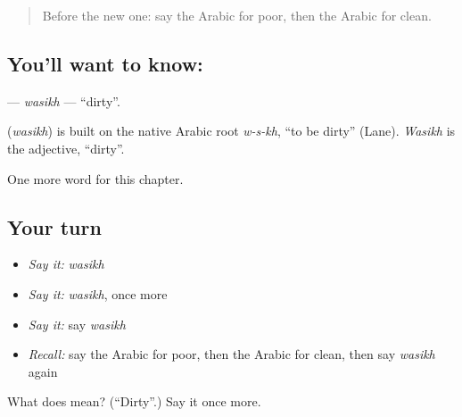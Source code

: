 \label{lesson:AR-C84-wasikh}



\begin{quote}
Before the new one: say the Arabic for poor, then the Arabic for clean.
\end{quote}

\subsection*{You'll want to know: }
\textbf{} — \emph{wasikh} — \textquotedblleft{}dirty\textquotedblright{}.

\begin{cousinweb}
\textbf{} (\emph{wasikh}) is built on the native Arabic root \emph{w-s-kh}, \textquotedblleft{}to be dirty\textquotedblright{} (Lane). \emph{Wasikh} is the adjective, \textquotedblleft{}dirty\textquotedblright{}.
\end{cousinweb}

\begin{grammarlens}[title={What you've built}]
One more word for this chapter.
\end{grammarlens}

\subsection*{Your turn}
\begin{itemize}
\raggedright
  \item \emph{Say it:} \emph{wasikh}
  \item \emph{Say it:} \emph{wasikh}, once more
  \item \emph{Say it:} say \emph{wasikh}
  \item \emph{Recall:} say the Arabic for poor, then the Arabic for clean, then say \emph{wasikh} again
\end{itemize}

\begin{tcolorbox}[breakable,colback=teal!4,colframe=teal!35!black,title={Before you move on}]
What does  mean? (\textquotedblleft{}Dirty\textquotedblright{}.) Say it once more.
\end{tcolorbox}
